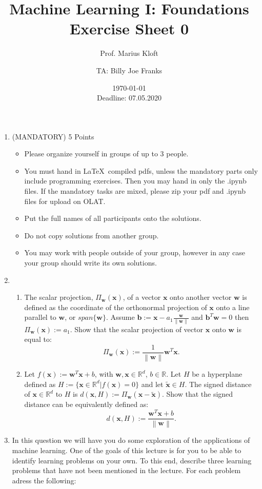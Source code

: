 \documentclass[]{scrartcl}
\author{Prof. Marius Kloft \and TA: Billy Joe Franks}
\title{Machine Learning I: Foundations \\ Exercise Sheet 0}
\date{\today\\Deadline: 07.05.2020}
\newcommand{\R}{\mathbb{R}}
\newcommand{\bx}{\mathbf{x}}
\newcommand{\bb}{\mathbf{b}}
\newcommand{\bw}{\mathbf{w}}
\begin{document}
\maketitle

\begin{enumerate}
\item (MANDATORY) 5 Points
	\begin{itemize}
	\item Please organize yourself in groups of up to 3 people.
	\item You must hand in \LaTeX~compiled pdfs, unless the mandatory parts only include programming exercises. Then you may hand in only the .ipynb files. If the mandatory tasks are mixed, please zip your pdf and .ipynb files for upload on OLAT.
	\item Put the full names of all participants onto the solutions.
	\item Do not copy solutions from another group.
	\item You may work with people outside of your group, however in any case your group should write its own solutions.
	\end{itemize}
\item
	\begin{enumerate}
	\item The scalar projection, $\Pi_\bw(\bx)$, of a vector $\bx$ onto another vector $\bw$ is defined as the coordinate of the orthonormal projection of $\bx$ onto a line parallel to $\bw$, or $span\{\bw\}$. Assume $\bb:=\bx-a_1\frac{\bw}{\left\lVert\bw\right\rVert}$ and $\bb^T\bw=0$ then $\Pi_\bw(\bx):=a_1$. Show that the scalar projection of vector $\bx$ onto $\bw$ is equal to:
	\begin{equation*}
	\Pi_\bw(\bx):=\frac{1}{\left\lVert\bw\right\rVert}\bw^T\bx.
	\end{equation*}
	\item Let $f(\bx):=\bw^T\bx+b$, with $\bw, \bx \in \R^d$, $b\in \R$. Let $H$ be a hyperplane defined as $H:=\{\bx \in \R^d|f(\bx)=0\}$ and let $\tilde{\bx}\in H$. The signed distance of $\bx \in \R^d$ to $H$ is $d(\bx,H):=\Pi_\bw(\bx-\tilde{\bx})$. Show that the signed distance can be equivalently defined as:
	\begin{equation*}
	d(\bx,H):=\frac{\bw^T\bx+b}{\left\lVert\bw\right\rVert}.
	\end{equation*}
	\end{enumerate}
\newpage
\item In this question we will have you do some exploration of the applications of machine learning. One of the goals of this lecture is for you to be able to identify learning problems on your own. To this end, describe three learning problems that have not been mentioned in the lecture. For each problem adress the following:

\end{enumerate}
\end{document}

